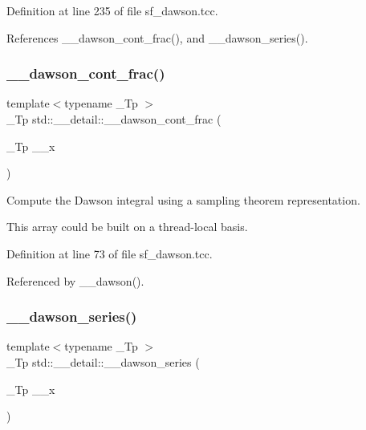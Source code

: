 Definition at line 235 of file sf\+\_\+dawson.\+tcc.



References \+\_\+\+\_\+dawson\+\_\+cont\+\_\+frac(), and \+\_\+\+\_\+dawson\+\_\+series().

\mbox{\label{namespacestd_1_1____detail_a3ad3b7b4dcebdf69778dbf7a5ba2427c}} 
\subsubsection{\texorpdfstring{\+\_\+\+\_\+dawson\+\_\+cont\+\_\+frac()}{\_\_dawson\_cont\_frac()}}
{\footnotesize\ttfamily template$<$typename \+\_\+\+Tp $>$ \\
\+\_\+\+Tp std\+::\+\_\+\+\_\+detail\+::\+\_\+\+\_\+dawson\+\_\+cont\+\_\+frac (\begin{DoxyParamCaption}\item[{\+\_\+\+Tp}]{\+\_\+\+\_\+x }\end{DoxyParamCaption})}



Compute the Dawson integral using a sampling theorem representation. 

This array could be built on a thread-\/local basis. 

Definition at line 73 of file sf\+\_\+dawson.\+tcc.



Referenced by \+\_\+\+\_\+dawson().

\mbox{\label{namespacestd_1_1____detail_a033d91cc1c67280385ff3d1d809a21d1}} 
\subsubsection{\texorpdfstring{\+\_\+\+\_\+dawson\+\_\+series()}{\_\_dawson\_series()}}
{\footnotesize\ttfamily template$<$typename \+\_\+\+Tp $>$ \\
\+\_\+\+Tp std\+::\+\_\+\+\_\+detail\+::\+\_\+\+\_\+dawson\+\_\+series (\begin{DoxyParamCaption}\item[{\+\_\+\+Tp}]{\+\_\+\+\_\+x }\end{DoxyParamCaption})}



